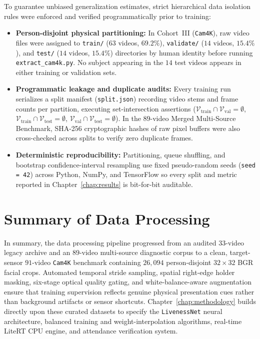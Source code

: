 To guarantee unbiased generalization estimates, strict hierarchical data isolation rules were enforced and verified programmatically prior to training:
\begin{itemize}
    \item \textbf{Person-disjoint physical partitioning:} In Cohort~III (\texttt{Cam4K}), raw video files were assigned to \texttt{train/} ($63$ videos, $69.2\%$), \texttt{validate/} ($14$ videos, $15.4\%$), and \texttt{test/} ($14$ videos, $15.4\%$) directories by human identity before running \texttt{extract\_cam4k.py}. No subject appearing in the $14$ test videos appears in either training or validation sets.
    \item \textbf{Programmatic leakage and duplicate audits:} Every training run serializes a split manifest (\texttt{split.json}) recording video stems and frame counts per partition, executing set-intersection assertions ($\mathcal{V}_{\text{train}} \cap \mathcal{V}_{\text{val}} = \emptyset$, $\mathcal{V}_{\text{train}} \cap \mathcal{V}_{\text{test}} = \emptyset$, $\mathcal{V}_{\text{val}} \cap \mathcal{V}_{\text{test}} = \emptyset$). In the $89$-video Merged Multi-Source Benchmark, SHA-256 cryptographic hashes of raw pixel buffers were also cross-checked across splits to verify zero duplicate frames.
    \item \textbf{Deterministic reproducibility:} Partitioning, queue shuffling, and bootstrap confidence-interval resampling use fixed pseudo-random seeds (\texttt{seed = 42}) across Python, NumPy, and TensorFlow so every split and metric reported in Chapter~\ref{chap:results} is bit-for-bit auditable.
\end{itemize}

\section{Summary of Data Processing}
\label{sec:data_summary}

In summary, the data processing pipeline progressed from an audited $33$-video legacy archive and an $89$-video multi-source diagnostic corpus to a clean, target-sensor $91$-video \texttt{Cam4K} benchmark containing $26{,}094$ person-disjoint $32\times32$ BGR facial crops. Automated temporal stride sampling, spatial right-edge holder masking, six-stage optical quality gating, and white-balance-aware augmentation ensure that training supervision reflects genuine physical presentation cues rather than background artifacts or sensor shortcuts. Chapter~\ref{chap:methodology} builds directly upon these curated datasets to specify the \texttt{LivenessNet} neural architecture, balanced training and weight-interpolation algorithms, real-time LiteRT CPU engine, and attendance verification system.
